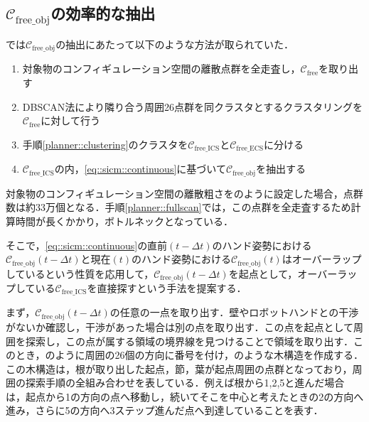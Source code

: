 \documentclass[a4paper,twoside,12pt,papersize, dvipdfmx]{iirthesis}
\begin{document}
\subsection{$\mathcal{C}_{\mathrm{free\_obj}}$の効率的な抽出}\label{subsec::planner::dfs}
\cite{komiyama2021}では$\mathcal{C}_{\mathrm{free\_obj}}$の抽出にあたって以下のような方法が取られていた．
\begin{enumerate}
\item 対象物のコンフィギュレーション空間の離散点群を全走査し，$\mathcal{C}_{\mathrm{free}}$を取り出す \label{planner::fullscan}
\item DBSCAN法\cite{ester1996}により隣り合う周囲26点群を同クラスタとするクラスタリングを$\mathcal{C}_{\mathrm{free}}$に対して行う\label{planner::clustering}
\item 手順\ref{planner::clustering}のクラスタを$\mathcal{C}_{\mathrm{free\_ICS}}$と$\mathcal{C}_{\mathrm{free\_ECS}}$に分ける
\item $\mathcal{C}_{\mathrm{free\_ICS}}$の内，\eqref{eq::sicm::continuous}に基づいて$\mathcal{C}_{\mathrm{free\_obj}}$を抽出する
\end{enumerate}
対象物のコンフィギュレーション空間の離散粗さをのように設定した場合，点群数は約33万個となる．手順\ref{planner::fullscan}では，この点群を全走査するため計算時間が長くかかり，ボトルネックとなっている．\par

そこで，\eqref{eq::sicm::continuous}の直前$(t-\Delta t)$のハンド姿勢における$\mathcal{C}_{\mathrm{free\_obj}}(t-\Delta t)$と現在$(t)$のハンド姿勢における$\mathcal{C}_{\mathrm{free\_obj}}(t)$はオーバーラップしているという性質を応用して，$\mathcal{C}_{\mathrm{free\_obj}}(t-\Delta t)$を起点として，オーバーラップしている$\mathcal{C}_{\mathrm{free\_ICS}}$を直接探すという手法を提案する．\par

まず，$\mathcal{C}_{\mathrm{free\_obj}}(t-\Delta t)$の任意の一点を取り出す．壁やロボットハンドとの干渉がないか確認し，干渉があった場合は別の点を取り出す．この点を起点として周囲を探索し，この点が属する領域の境界線を見つけることで領域を取り出す．このとき，のように周囲の26個の方向に番号を付け，のような木構造を作成する．この木構造は，根が取り出した起点，節，葉が起点周囲の点群となっており，周囲の探索手順の全組み合わせを表している．例えば根から1,2,5と進んだ場合は，起点から1の方向の点へ移動し，続いてそこを中心と考えたときの2の方向へ進み，さらに5の方向へ3ステップ進んだ点へ到達していることを表す．\par
\end{document}

